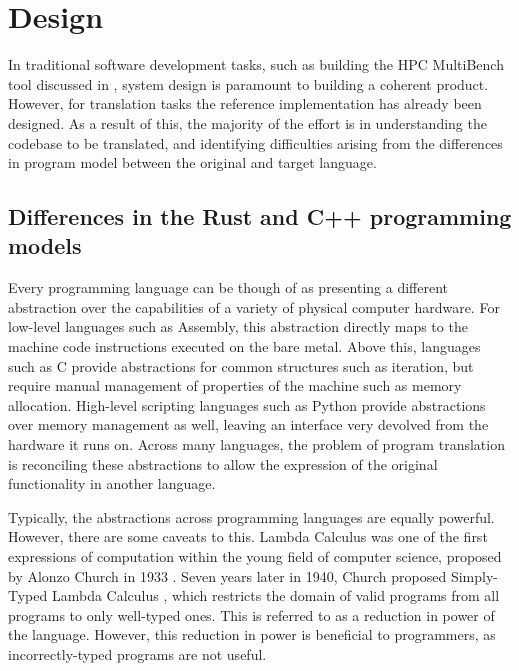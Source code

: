 \section{Design}
\label{sec:translation-design} %

In traditional software development tasks, such as building the HPC MultiBench tool discussed in , system design is paramount to building a coherent product. However, for translation tasks the reference implementation has already been designed. As a result of this, the majority of the effort is in understanding the codebase to be translated, and identifying difficulties arising from the differences in program model between the original and target language.

\subsection{Differences in the Rust and C++ programming models}
\label{sec:rust-cpp-programming-models}

Every programming language can be though of as presenting a different abstraction over the capabilities of a variety of physical computer hardware. For low-level languages such as Assembly, this abstraction directly maps to the machine code instructions executed on the bare metal. Above this, languages such as C provide abstractions for common structures such as iteration, but require manual management of properties of the machine such as memory allocation. High-level scripting languages such as Python provide abstractions over memory management as well, leaving an interface very devolved from the hardware it runs on. Across many languages, the problem of program translation is reconciling these abstractions to allow the expression of the original functionality in another language.

Typically, the abstractions across programming languages are equally powerful. However, there are some caveats to this. Lambda Calculus was one of the first expressions of computation within the young field of computer science, proposed by Alonzo Church in 1933 \cite{church1932set}. Seven years later in 1940, Church proposed Simply-Typed Lambda Calculus \cite{church1940formulation}, which restricts the domain of valid programs from all programs to only well-typed ones. This is referred to as a reduction in power of the language. However, this reduction in power is beneficial to programmers, as incorrectly-typed programs are not useful. %

